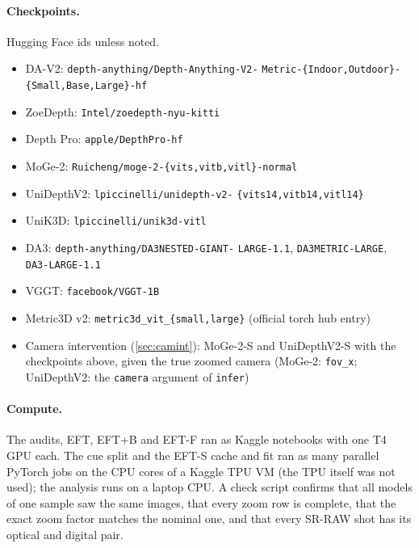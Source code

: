 \documentclass[10pt,twocolumn,letterpaper]{article}
\begin{document}
\paragraph{Checkpoints.} Hugging Face ids unless noted.
{\footnotesize\raggedright
\begin{itemize}\setlength{\itemsep}{0pt}
\item DA-V2: \texttt{depth-anything/Depth-Anything-V2-} \texttt{Metric-\{Indoor,Outdoor\}-\{Small,Base,Large\}-hf}
\item ZoeDepth: \texttt{Intel/zoedepth-nyu-kitti}
\item Depth Pro: \texttt{apple/DepthPro-hf}
\item MoGe-2: \texttt{Ruicheng/moge-2-\{vits,vitb,vitl\}-normal}
\item UniDepthV2: \texttt{lpiccinelli/unidepth-v2-} \texttt{\{vits14,vitb14,vitl14\}}
\item UniK3D: \texttt{lpiccinelli/unik3d-vitl}
\item DA3: \texttt{depth-anything/DA3NESTED-GIANT-} \texttt{LARGE-1.1}, \texttt{DA3METRIC-LARGE}, \texttt{DA3-LARGE-1.1}
\item VGGT: \texttt{facebook/VGGT-1B}
\item Metric3D v2: \texttt{metric3d\_vit\_\{small,large\}} (official torch hub entry)
\item Camera intervention (\cref{sec:camint}): MoGe-2-S and UniDepthV2-S with the checkpoints above, given the
true zoomed camera (MoGe-2: \texttt{fov\_x}; UniDepthV2: the \texttt{camera} argument of \texttt{infer})
\end{itemize}}

\paragraph{Compute.} The audits, EFT, EFT+B and EFT-F ran as Kaggle notebooks with one T4 GPU each. The cue
split and the EFT-S cache and fit ran as many parallel PyTorch jobs on the CPU cores
of a Kaggle TPU VM (the TPU itself was not used); the analysis runs on a laptop CPU. A check script confirms that
all models of one sample saw the same images, that every zoom row is complete, that the exact zoom factor matches
the nominal one, and that every SR-RAW shot has its optical and digital pair.

{\small}
\end{document}
